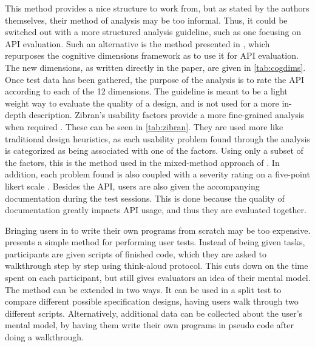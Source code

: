 This method provides a nice structure to work from, but as stated by the authors themselves, their method of analysis may be too informal.
Thus, it could be switched out with a more structured analysis guideline, such as one focusing on \gls{API} evaluation.
Such an alternative is the method presented in \citet{clarke2003using}, which repurposes the cognitive dimensions framework \cite{wikiCognitiveDimensions} as to use it for \gls{API} evaluation.
The new dimensions, as written directly in the paper, are given in \cref{tab:cogdims}.
Once test data has been gathered, the purpose of the analysis is to rate the \gls{API} according to each of the 12 dimensions.
The guideline is meant to be a light weight way to evaluate the quality of a design, and is not used for a more in-depth description.
Zibran’s usability factors provide a more fine-grained analysis when required \cite{zibran2011useful}.
These can be seen in \cref{tab:zibran}.
They are used more like traditional design heuristics, as each usability problem found through the analysis is categorized as being associated with one of the factors.
Using only a subset of the factors, this is the method used in the mixed-method approach of \citet{grill2012methods}.
In addition, each problem found is also coupled with a severity rating on a five-point likert scale \cite{wikiLikert}. 
Besides the \gls{API}, users are also given the accompanying documentation during the test sessions. 
This is done because the quality of documentation greatly impacts \gls{API} usage, and thus they are evaluated together. 

Bringing users in to write their own programs from scratch may be too expensive.
\cite{o2010api} presents a simple method for performing user tests.
Instead of being given tasks, participants are given scripts of finished code, which they are asked to walkthrough step by step using think-aloud protocol.
This cuts down on the time spent on each participant, but still gives evaluators an idea of their mental model.
The method can be extended in two ways. 
It can be used in a split test to compare different possible specification designs, having users walk through two different scripts.
Alternatively, additional data can be collected about the user’s mental model, by having them write their own programs in pseudo code after doing a walkthrough.

